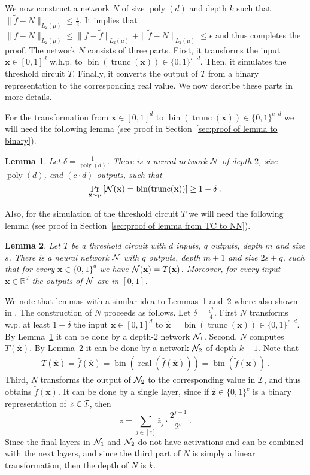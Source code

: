 \documentclass[11pt]{article}
\newtheorem{lemma}{Lemma}[section]
\newcommand{\bx}{\mathbf{x}}
\newcommand{\bz}{\mathbf{z}}
\newcommand{\ci}{{\cal I}}
\newcommand{\cn}{{\cal N}}
\newcommand{\reals}{{\mathbb R}}
\DeclareMathOperator{\poly}{poly}
\DeclareMathOperator{\bin}{bin}
\DeclareMathOperator{\real}{real}
\DeclareMathOperator{\trunc}{trunc}
\newcommand{\snorm}[1]{\|#1\|} %
\newcommand{\hbx}{{\hat{\bx}}}
\begin{document}
We now construct a network $N$ of size $\poly(d)$ and depth $k$ such that $\snorm{\tilde{f}-N}_{L_2(\mu)} \leq \frac{\epsilon}{2}$. It implies that $\snorm{f-N}_{L_2(\mu)} \leq \snorm{f-\tilde{f}}_{L_2(\mu)} + \snorm{\tilde{f}-N}_{L_2(\mu)} \leq \epsilon$ and thus completes the proof.
The network $N$ consists of three parts. First, it transforms the input $\bx \in [0,1]^d$ w.h.p. to $\bin(\trunc(\bx)) \in  \{0,1\}^{c \cdot d}$. Then, it simulates the threshold circuit $T$. Finally, it converts the output of $T$ from a binary representation to the corresponding real value. We now describe these parts in more details.

For the transformation from $\bx \in [0,1]^d$ to $\bin(\trunc(\bx)) \in  \{0,1\}^{c \cdot d}$ we will need the following lemma (see proof in Section~\ref{sec:proof of lemma to binary}).
\begin{lemma}
	\label{lemma:to binary}
	Let $\delta = \frac{1}{\poly(d)}$.
	There is a neural network $\cn$ of depth $2$, size $\poly(d)$, and $(c \cdot d)$ outputs, such that 
	\[
	\Pr_{\bx \sim \mu}\left[ \cn(\bx) = \bin(\trunc(\bx)) \right] \geq 1 - \delta~.
	\] 
\end{lemma}

Also, for the simulation of the threshold circuit $T$ we will need the following lemma (see proof in Section~\ref{sec:proof of lemma from TC to NN}).
\begin{lemma}
	\label{lemma:from TC to NN}
	Let $T$ be a threshold circuit with $d$ inputs, $q$ outputs, depth $m$ and size 
	$s$.
	There is a neural network $\cn$ with $q$ outputs, depth $m+1$ and size 
	$2s+q$,
	such that for every $\bx \in \{0,1\}^d$ we have $\cn(\bx) = T(\bx)$.	
	Moreover, for every input $\bx \in \reals^d$ the outputs of $\cn$ are in $[0,1]$.
\end{lemma}

We note that lemmas with a similar idea to Lemmas~\ref{lemma:to binary} and~\ref{lemma:from TC to NN} where also shown in \cite{vardi2020neural}.
The construction of $N$ proceeds as follows. 
Let $\delta= \frac{\epsilon^2}{4}$.
First $N$ transforms w.p. at least $1-\delta$ the input $\bx \in [0,1]^d$ to $\hbx = \bin(\trunc(\bx)) \in  \{0,1\}^{c \cdot d}$. By Lemma~\ref{lemma:to binary} it can be done by a depth-$2$ network $\cn_1$. Second, $N$ computes $T(\hbx)$. By Lemma~\ref{lemma:from TC to NN} it can be done by a network $\cn_2$ of depth $k-1$. 
Note that 
\begin{align*}
	T(\hbx) 
	= \hat{f}(\hbx) 
	= \bin(\real(\hat{f}(\hbx) ))
	= \bin(\tilde{f}(\bx))~.
\end{align*}
Third, $N$ transforms the output of $\cn_2$ to the corresponding value in $\ci$, and thus obtains $\tilde{f}(\bx)$. It can be done by a single layer, since if $\hat{\bz} \in \{0,1\}^{c}$ is a binary representation of $z \in \ci$, then 
\begin{equation}
	\label{eq:final sum}
	z = \sum_{j \in [c]}\hat{z}_j \cdot \frac{2^{j-1}}{2^c}~.
\end{equation}
Since the final layers in $\cn_1$ and $\cn_2$ do not have activations and can be combined with the next layers, and since the third part of $N$ is simply a linear transformation, then the depth of $N$ is $k$.
\end{document}
